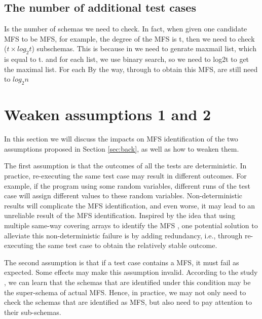 \documentclass{sig-alternate-05-2015}
\begin{document}
{{{{\subsection{The number of additional  test cases}

Is the number of schemas we need to check. In fact, when given one candidate MFS to be MFS, for example, the degree of the MFS is t, then we need to check ($t \times log_{2} t$) subschemas. This is because in we need to genrate maxmail list, which is equal to t. and for each list, we use binary search, so we need to log2t to get the maximal list. For each
By the way, through to obtain this MFS, are still need to $log_{2}n$


\section{Weaken assumptions 1 and 2}
In this section we will discuss the impacts on MFS identification of the two assumptions proposed in Section \ref{sec:back}, as well as how to weaken them.

The first assumption is that the outcomes of all the tests are deterministic. In practice, re-executing the same test case may result in different outcomes. For example, if the program using some random variables, different runs of the test case will assign different
values to these random variables. Non-deterministic results will complicate the MFS identification, and even worse, it may lead to an unreliable result of the MFS identification. Inspired by the idea that using multiple same-way covering arrays to identify the MFS \cite{fouche2009incremental,yilmaz2006covering}, one potential solution to alleviate this non-deterministic failure is by adding redundancy, i.e., through re-executing the same test case to obtain the relatively stable outcome.

The second assumption is that if a test case contains a MFS, it must fail as expected. Some effects \cite{Masri:2014:PCC:2582050.2559932,yilmaz2013reducing} may make this assumption invalid. According to the study \cite{zhang2011characterizing}, we can learn that the schemas that are identified under this condition may be the super-schema of actual MFS. Hence, in practice, we may not only need to check the schemas that are identified as MFS, but also need to pay attention to their sub-schemas.

}}}}
\end{document}
